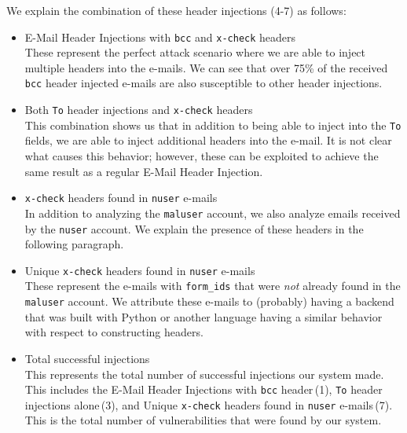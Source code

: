 
We explain the combination of these header injections (4-7) as follows:
\begin{itemize}
	\item E-Mail Header Injections with \texttt{bcc} and \texttt{x-check} headers\\
	These represent the perfect attack scenario where we are able to inject multiple headers into the e-mails. We can see that over 75\% of the received \texttt{bcc} header injected e-mails are also susceptible to other header injections.
	
	\item Both \texttt{To} header injections and \texttt{x-check} headers \\
	This combination shows us that in addition to being able to inject into the \texttt{To} fields, we are able to inject additional headers into the e-mail. It is not clear what causes this behavior; however, these can be exploited to achieve the same result as a regular E-Mail Header Injection.
	
	\item \texttt{x-check} headers found in \texttt{nuser} e-mails\\
	In addition to analyzing the \texttt{maluser} account, we also analyze emails received by the \texttt{nuser} account. We explain the presence of these headers in the following paragraph.

	\item Unique \texttt{x-check} headers found in \texttt{nuser} e-mails\\
	These represent the e-mails with \lstinline|form_ids| that were \emph{not} already found in the \texttt{maluser} account. We attribute these e-mails to (probably) having a backend that was built with Python or another language having a similar behavior with respect to constructing headers.
	
	\item Total successful injections\\
	This represents the total number of successful injections our system made. This includes the E-Mail Header Injections with \texttt{bcc} header\,(1), \texttt{To} header injections alone\,(3), and Unique \texttt{x-check} headers found in \texttt{nuser} e-mails\,(7). This is the total number of vulnerabilities that were found by our system.
	
\end{itemize}
